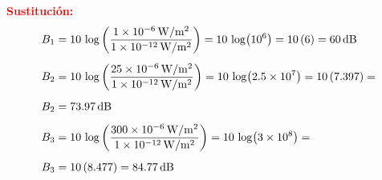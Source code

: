 \documentclass[14pt]{extarticle}
\newcommand{\textocolor}[2]{\textbf{\textcolor{#1}{#2}}}
\begin{document}
\begin{enumerate}
\textocolor{red}{Sustitución:}
\begin{align*}
B_{1} &= 10 \, \log \left( \dfrac{\SI{1d-6}{\watt\per\square\meter}}{\SI{1d-12}{\watt\per\square\meter}} \right) = 10 \, \log (\num{d6}) = 10 \, (6) = \SI{60}{\dB} \\[0.5em]
B_{2} &= 10 \, \log \left( \dfrac{\SI{25d-6}{\watt\per\square\meter}}{\SI{1d-12}{\watt\per\square\meter}} \right) = 10 \, \log (\num{2.5d7}) = 10 \, (7.397) = \\[0.5em]
B_{2} &= \SI{73.97}{\dB} \\[0.5em]
B_{3} &= 10 \, \log \left( \dfrac{\SI{300d-6}{\watt\per\square\meter}}{\SI{1d-12}{\watt\per\square\meter}} \right) = 10 \, \log (\num{3d8}) = \\[0.5em]
B_{3} &= 10 \, (8.477) = \SI{84.77}{\dB}
\end{align*}    
\end{enumerate}
\end{document}
